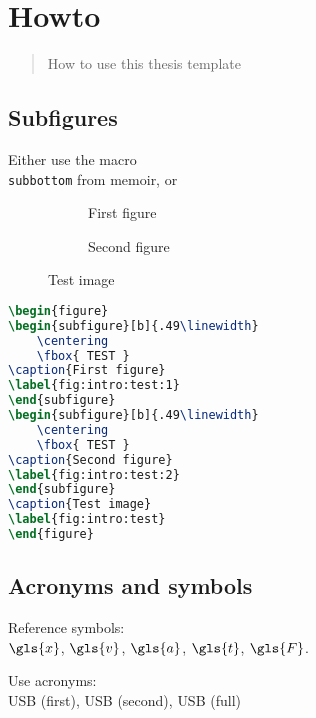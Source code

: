 \chapter{Howto}
\label{c:howto}

\begin{abstract}%
    How to use this thesis template
\end{abstract}

\section{Subfigures}
\label{s:howto:subfigures}
Either use the macro \texttt{\\subbottom} from memoir, or 

\begin{figure}
\begin{subfigure}[b]{.49\linewidth} 
    \centering
\caption{First figure}
\label{fig:intro:test:1}
\end{subfigure}
\begin{subfigure}[b]{.49\linewidth} 
    \centering
\caption{Second figure}
\label{fig:intro:test:2}
\end{subfigure}
\caption{Test image}
\label{fig:intro:test}
\end{figure}

\begin{lstlisting}[language=tex]
\begin{figure}
\begin{subfigure}[b]{.49\linewidth} 
    \centering
    \fbox{ TEST }
\caption{First figure}
\label{fig:intro:test:1}
\end{subfigure}
\begin{subfigure}[b]{.49\linewidth} 
    \centering
    \fbox{ TEST }
\caption{Second figure}
\label{fig:intro:test:2}
\end{subfigure}
\caption{Test image}
\label{fig:intro:test}
\end{figure}
\end{lstlisting}

\section{Acronyms and symbols}
Reference symbols: \\
$\gls{x}$, $\gls{v}$, $\gls{a}$, $\gls{t}$, $\gls{F}$.

Use acronyms: \\
\ac{USB} (first), \ac{USB} (second), \acf{USB} (full)
